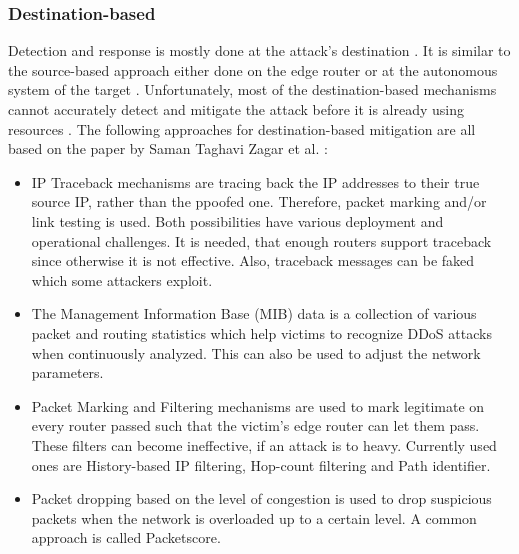 \subsubsection*{Destination-based}
Detection and response is mostly done at the attack's destination \cite{DDoS-MitigationSurvey}. It is similar to the source-based approach either done on the edge router or at the autonomous system of the target \cite{DDoS-MitigationSurvey}. Unfortunately, most of the destination-based mechanisms cannot accurately detect and mitigate the attack before it is already using resources \cite{DDoS-MitigationSurvey}. The following approaches for destination-based mitigation are all based on the paper by Saman Taghavi Zagar et al. \cite{DDoS-MitigationSurvey}:
    \begin{itemize}
        \item IP Traceback mechanisms are tracing back the IP addresses to their true source IP, rather than the ppoofed one. Therefore, packet marking and/or link testing is used. Both possibilities have various deployment and operational challenges. It is needed, that enough routers support traceback since otherwise it is not effective. Also, traceback messages can be faked which some attackers exploit.
        \item The Management Information Base (MIB) data is a collection of various packet and routing statistics which help victims to recognize DDoS attacks when continuously analyzed. This can also be used to adjust the network parameters. 
        \item Packet Marking and Filtering mechanisms are used to mark legitimate on every router passed such that the victim's edge router can let them pass. These filters can become ineffective, if an attack is to heavy. Currently used ones are History-based IP filtering, Hop-count filtering and Path identifier.
        \item Packet dropping based on the level of congestion is used to drop suspicious packets when the network is overloaded up to a certain level. A common approach is called Packetscore. 
    \end{itemize}
    
